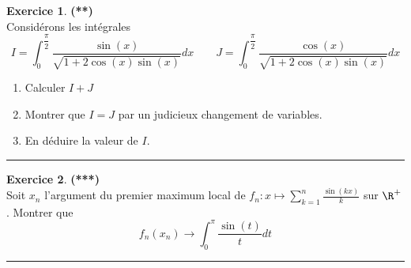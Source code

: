 \documentclass[a4paper,11pt]{article}
\theoremstyle{definition}
\newtheorem{exo}{Exercice} %
\begin{document}
	


\begin{exo}\textbf{(**)}\quad\\[0.25cm]%
Considérons les intégrales
$$\displaystyle I = \int_0^{\dfrac{\pi}{2}} \frac{\sin(x)}{\sqrt{1 + 2\cos(x)\sin(x)}}d x \quad \quad J = \int_0^{\dfrac{\pi}{2}} \frac{\cos(x)}{\sqrt{1 + 2\cos(x)\sin(x)}}d x$$

\begin{enumerate}
	\item Calculer $I + J$
	\item Montrer que $I = J$ par un judicieux changement de variables.
	\item En déduire la valeur de $I $.
\end{enumerate}
	\centering
\rule{1\linewidth}{0.6pt}
\end{exo}

\begin{exo}\textbf{(***)}\quad\\[0.25cm]%
	Soit $x_n$ l’argument du premier maximum local de $\displaystyle f_n : x \mapsto \sum_{k=1}^{n} \frac{\sin(kx)}{k}$ sur $\R^+$. Montrer que $$\displaystyle f_n(x_n) \to \int_{0}^{\pi}\dfrac{\sin(t)}{t}dt$$
	
	\centering
	\rule{1\linewidth}{0.6pt}
\end{exo}
\end{document}
